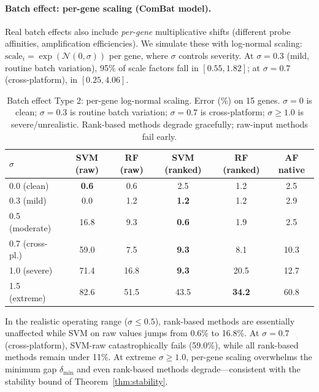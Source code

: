 \documentclass[12pt]{article}
\begin{document}
\paragraph{Batch effect: per-gene scaling (ComBat model).}
Real batch effects also include \emph{per-gene} multiplicative shifts (different probe affinities, amplification efficiencies). We simulate these with log-normal scaling: $\text{scale}_i = \exp(\mathcal{N}(0, \sigma))$ per gene, where $\sigma$ controls severity. At $\sigma = 0.3$ (mild, routine batch variation), 95\% of scale factors fall in $[0.55, 1.82]$; at $\sigma = 0.7$ (cross-platform), in $[0.25, 4.06]$.

\begin{table}[ht]
\centering
\caption{Batch effect Type 2: per-gene log-normal scaling. Error (\%) on 15 genes. $\sigma = 0$ is clean; $\sigma = 0.3$ is routine batch variation; $\sigma = 0.7$ is cross-platform; $\sigma \geq 1.0$ is severe/unrealistic. Rank-based methods degrade gracefully; raw-input methods fail early.}
\label{tab:gene-pergene}
\small
\begin{tabular}{lccccc}
\toprule
$\sigma$ & SVM (raw) & RF (raw) & SVM (ranked) & RF (ranked) & AF native \\
\midrule
0.0 (clean)    & \textbf{0.6}  & 0.6  & 2.5  & 1.2  & 2.5 \\
0.3 (mild)     & 0.0  & 1.2  & \textbf{1.2}  & 1.2  & 2.9 \\
0.5 (moderate) & 16.8 & 9.3  & \textbf{0.6}  & 1.9  & 2.5 \\
0.7 (cross-pl.)& 59.0 & 7.5  & \textbf{9.3}  & 8.1  & 10.3 \\
1.0 (severe)   & 71.4 & 16.8 & \textbf{9.3}  & 20.5 & 12.7 \\
1.5 (extreme)  & 82.6 & 51.5 & 43.5 & \textbf{34.2} & 60.8 \\
\bottomrule
\end{tabular}
\end{table}

In the realistic operating range ($\sigma \leq 0.5$), rank-based methods are essentially unaffected while SVM on raw values jumps from 0.6\% to 16.8\%. At $\sigma = 0.7$ (cross-platform), SVM-raw catastrophically fails (59.0\%), while all rank-based methods remain under 11\%. At extreme $\sigma \geq 1.0$, per-gene scaling overwhelms the minimum gap $\delta_{\min}$ and even rank-based methods degrade---consistent with the stability bound of Theorem~\ref{thm:stability}.
\end{document}

